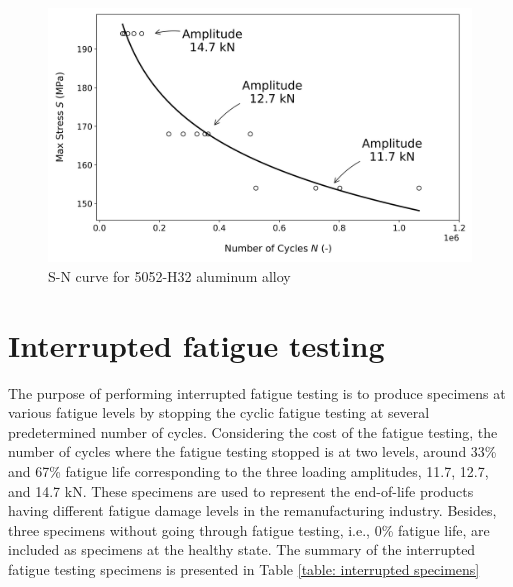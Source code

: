 \begin{figure}[tb]
  \includegraphics[width=\linewidth]{fig/sn_curve.png}
  \caption{S-N curve for 5052-H32 aluminum alloy}
  \label{fig: raw sn curve}
\end{figure}

\section{Interrupted fatigue testing}
The purpose of performing interrupted fatigue testing is to produce specimens at various fatigue levels by stopping the cyclic fatigue testing at several predetermined number of cycles. Considering the cost of the fatigue testing, the number of cycles where the fatigue testing stopped is at two levels, around 33\% and 67\% fatigue life corresponding to the three loading amplitudes, 11.7, 12.7, and 14.7 kN. These specimens are used to represent the end-of-life products having different fatigue damage levels in the remanufacturing industry. Besides, three specimens without going through fatigue testing, i.e., 0\% fatigue life, are included as specimens at the healthy state. The summary of the interrupted fatigue testing specimens is presented in Table \ref{table: interrupted specimens}

